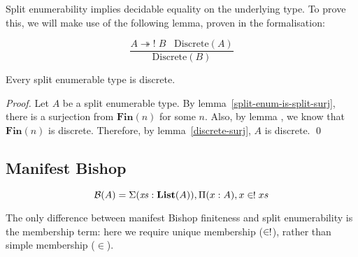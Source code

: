 Split enumerability implies decidable equality on the underlying type.
To prove this, we will make use of the following lemma, proven in the
formalisation:
\begin{romlemma} \label{discrete-surj}
  \begin{equation}
    \frac{
        A \twoheadrightarrow! \; B \; \; \; \text{Discrete}(A)
      }{
       \text{Discrete}(B) 
      }
  \end{equation}
\end{romlemma}
\begin{romlemma}
  Every split enumerable type is discrete.
\end{romlemma}
\begin{proof}
  Let \(A\) be a split enumerable type.
  By lemma~\ref{split-enum-is-split-surj}, there is a surjection from
  \(\mathbf{Fin}(n)\) for some \(n\).
  Also, by lemma , we know that
  \(\mathbf{Fin}(n)\) is discrete.
  Therefore, by lemma~\ref{discrete-surj}, \(A\) is discrete.
  \qed
\end{proof}
\subsection{Manifest Bishop}
\begin{romdefinition}
  \begin{equation}
    \mathcal{B}(A) = \Sigma {(\mathit{xs} : \textbf{List}(A))} , \Pi {(x : A)} , x \inunique xs
  \end{equation}
\end{romdefinition}
The only difference between manifest Bishop finiteness and split enumerability
is the membership term: here we require unique membership (\(\inunique\)),
rather than simple membership (\(\in\)).

